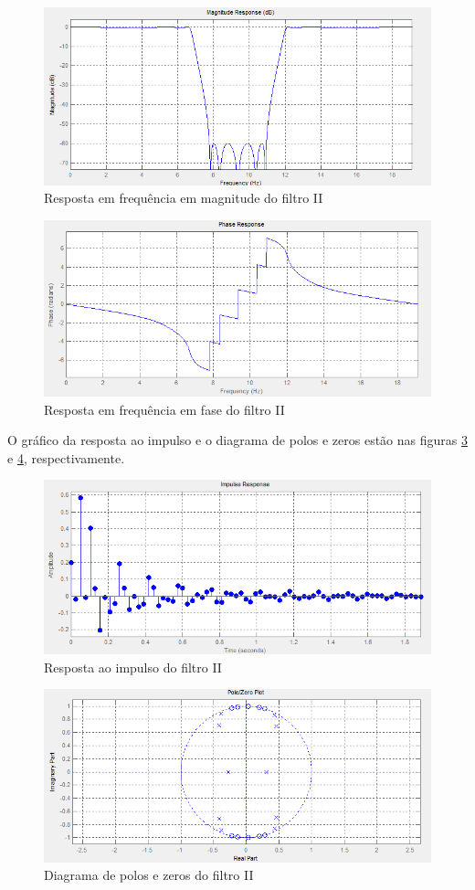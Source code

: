 \documentclass[a4paper,10pt]{article}
\begin{document}
\begin{figure}[ht]
 \centering
 \includegraphics[width=12cm]{pictures/Filtro2/Magnitude.png}
 \caption{Resposta em frequência em magnitude do filtro II}
 \label{fig:magnitude2}
\end{figure}

\begin{figure}[ht]
 \centering
 \includegraphics[width=12cm]{pictures/Filtro2/Fase.png}
 \caption{Resposta em frequência em fase do filtro II}
 \label{fig:fase2}
\end{figure}

O gráfico da resposta ao impulso e o diagrama de polos e zeros estão nas figuras \ref{fig:resimp2} e \ref{fig:diapolozero2}, respectivamente.

\begin{figure}[ht]
 \centering
 \includegraphics[width=12cm]{pictures/Filtro2/RespImpulso.png}
 \caption{Resposta ao impulso do filtro II}
 \label{fig:resimp2}
\end{figure}

\begin{figure}[ht]
 \centering
 \includegraphics[width=12cm]{pictures/Filtro2/Polos&Zeros.png}
 \caption{Diagrama de polos e zeros do filtro II}
 \label{fig:diapolozero2}
\end{figure}
\end{document}
